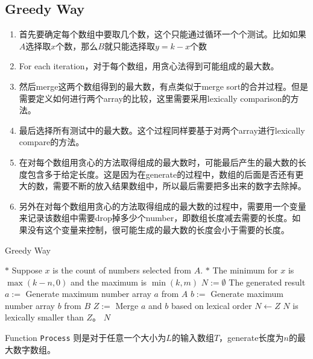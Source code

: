 \subsection{Greedy Way}
\begin{enumerate}
\item 首先要确定每个数组中要取几个数，这个只能通过循环一个个测试。比如如果$A$选择取$x$个数，那么$B$就只能选择取$y=k-x$个数
\item For each iteration，对于每个数组，用贪心法得到可能组成的最大数。
\item 然后merge这两个数组得到的最大数，有点类似于merge sort的合并过程。但是需要定义如何进行两个array的比较，这里需要采用lexically comparison的方法。
\item 最后选择所有测试中的最大数。这个过程同样要基于对两个array进行lexically compare的方法。
\item 在对每个数组用贪心的方法取得组成的最大数时，可能最后产生的最大数的长度包含多于给定长度。这是因为在generate的过程中，数组的后面是否还有更大的数，需要不断的放入结果数组中，所以最后需要把多出来的数字去除掉。 \label{step0}
\item 另外在对每个数组用贪心的方法取得组成的最大数的过程中，需要用一个变量来记录该数组中需要drop掉多少个number，即数组长度减去需要的长度。如果没有这个变量来控制，很可能生成的最大数的长度会小于需要的长度。
\end{enumerate}
\setcounter{algorithm}{0}
\begin{algorithm}[H]
\caption{Greedy Way}
\begin{algorithmic}[1]
\State $\ast$ Suppose $x$ is the count of numbers selected from $A$.
\State $\ast$ The minimum for $ x $ is $ \max(k-n, 0) $ and the maximum is $ \min(k, m) $
\State $N:=\emptyset$ \Comment The generated result 
\State $ a := $  \Comment Generate maximum number array $ a $ from $A$
\State $ b := $  \Comment Generate maximum number array $ b $ from $B$
\State $ Z:= $  \Comment Merge $a$ and $b$ based on lexical order
\State $N\gets Z$ \Comment $ N $ is lexically smaller than $ Z $。
\EndIf
\EndFor
\State \Return $N$
\EndProcedure
\end{algorithmic}
\end{algorithm}
Function \texttt{Process} 则是对于任意一个大小为$ L $的输入数组$ T $，generate长度为$ n $的最大数字数组。
